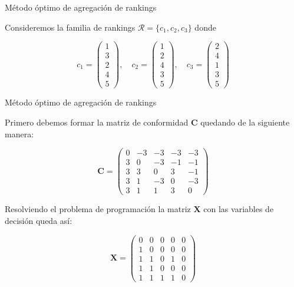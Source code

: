 \documentclass[10pt]{beamer}
\begin{document}
	\begin{frame}{Método óptimo de agregación de rankings}
		\begin{ejemplo}
			Consideremos la familia de rankings $\mathcal{R} = \{c_1, c_2, c_3\}$ donde
			
			\begin{equation*}
			c_1 = \left( \begin{array}{c}
			1\\
			3\\
			2\\
			4\\
			5
			\end{array} \right), \quad
			c_2 = \left( \begin{array}{c}
			1\\
			2\\
			4\\
			3\\
			5
			\end{array} \right), \quad
			c_3 = \left( \begin{array}{c}
			2\\
			4\\
			1\\
			3\\
			5
			\end{array} \right)
			\end{equation*}
			
		\end{ejemplo}
	\end{frame}
	
	\begin{frame}{Método óptimo de agregación de rankings}
		\begin{ejemplo}[continuación]
			Primero debemos formar la matriz de conformidad $\mathbf{C}$ quedando de la siguiente manera:
			
			\begin{equation*}
			\mathbf{C} = \left(\begin{array}{rrrrr}
			0 & -3 & -3 & -3 & -3 \\
			3 &  0 & -3 & -1 & -1 \\
			3 &  3 &  0 &  3 & -1 \\
			3 &  1 & -3 &  0 & -3 \\
			3 &  1 &  1	&  3 &	0
			\end{array}\right)
			\end{equation*}
			
			Resolviendo el problema de programación la matriz $\mathbf{X}$ con las variables de decisión queda así:
			
			\begin{equation*}
			\mathbf{X} = \left(\begin{array}{rrrrr}
			0 & 0 & 0 & 0 & 0 \\
			1 & 0 & 0 & 0 & 0 \\
			1 & 1 & 0 & 1 & 0 \\
			1 & 1 & 0 & 0 & 0 \\
			1 & 1 & 1 & 1 &	0
			\end{array}\right)
			\end{equation*}
			
			
		\end{ejemplo}
	\end{frame}
	
\end{document}
